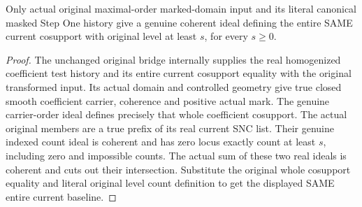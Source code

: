 \begin{theorem}
\label{hir:original-step-one-current-level-baseline-coherent-ideal}
\leanok
{}
Only actual original maximal-order marked-domain input and its literal canonical
masked Step One history give a genuine coherent ideal defining the entire SAME
current cosupport with original level at least $s$, for every $s\ge0$.
\end{theorem}
\begin{proof}
The unchanged original bridge internally supplies the real homogenized
coefficient test history and its entire current cosupport equality with the
original transformed input. Its actual domain and controlled geometry give
true closed smooth coefficient carrier, coherence and positive actual mark.
The genuine carrier-order ideal defines precisely that whole coefficient
cosupport. The actual original members are a true prefix of its real current
SNC list. Their genuine indexed count ideal is coherent and has zero locus
exactly count at least $s$, including zero and impossible counts. The actual
sum of these two real ideals is coherent and cuts out their intersection.
Substitute the original whole cosupport equality and literal original level
count definition to get the displayed SAME entire current baseline.
\end{proof}

